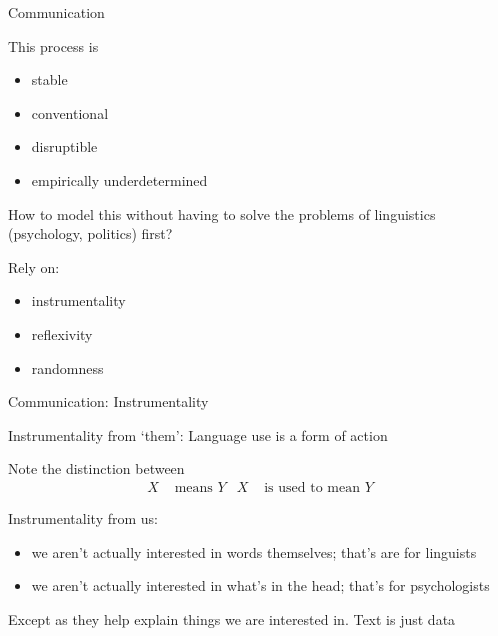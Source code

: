 \documentclass{hertieteaching}\usepackage[]{graphicx}\usepackage[]{color}
\begin{document}
\begin{frame}{Communication}

This process is
\begin{itemize}
  \item stable \parencite{Searle1995,Grice1993}
  \item conventional \parencite{Lewis2011}
  \item disruptible  \parencite{Riker.etal1996}
  \item empirically underdetermined \parencite{Quine1960,Davidson1985}
\end{itemize}

How to model this without having to solve the problems of linguistics (psychology, politics) first?

Rely on:
\begin{itemize}
  \item instrumentality
  \item reflexivity
  \item randomness
\end{itemize}

\end{frame}

\begin{frame}{Communication: Instrumentality}

Instrumentality from `them': Language use is a form of action \parencite{Wittgenstein1958,Austin1962,Krebs.Dawkins1984}

Note the distinction between
\begin{align*}
X &\text{~means~} Y & X &\text{~is used to mean~} Y
\end{align*}

Instrumentality from us:
\begin{itemize}
  \item we aren't actually interested in words themselves; that's are for linguists
  \item we aren't actually interested in what's in the head; that's for psychologists
\end{itemize}

Except as they help explain things we are interested in. Text is just data

\end{frame}
\end{document}
